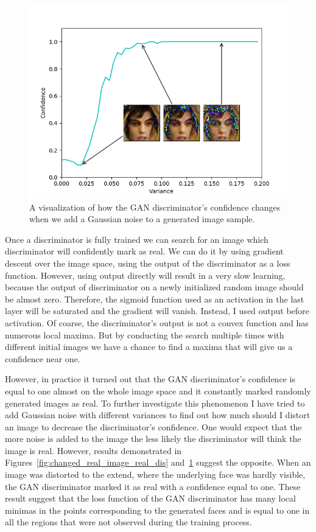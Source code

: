 \begin{figure}[h!]
	\includegraphics[width=\textwidth]{figures/diversity_gan2_fake_dis_gen_images}
	\caption{A visualization of how the GAN discriminator's confidence changes when we add a Gaussian noise to a generated image sample.}
	\label{fig:changed_gen_image_fake_dis}
\end{figure}

Once a discriminator is fully trained we can search for an image which discriminator will confidently mark as real. We can do it by using gradient descent over the image space, using the output of the discriminator as a loss function. However, using output directly will result in a very slow learning, because the output of discriminator on a newly initialized random image should be almost zero. Therefore, the sigmoid function used as an activation in the last layer will be saturated and the gradient will vanish. Instead, I used output before activation. Of coarse, the discriminator's output is not a convex function and has numerous local maxima. But by conducting the search multiple times with different initial images we have a chance to find a maxima that will give us a confidence near one. 

However, in practice it turned out that the GAN discriminator's confidence is equal to one almost on the whole image space and it constantly marked randomly generated images as real. To further investigate this phenomenon I have tried to add Gaussian noise with different variances to find out how much should I distort an image to decrease the discriminator's confidence. One would expect that the more noise is added to the image the less likely the discriminator will think the image is real. However, results demonstrated in Figures~\ref{fig:changed_real_image_real_dis} and~\ref{fig:changed_gen_image_fake_dis} suggest the opposite. When an image was distorted to the extend, where the underlying face was hardly visible, the GAN discriminator marked it as real with a confidence equal to one. These result suggest that the loss function of the GAN discriminator has many local minimas in the points corresponding to the generated faces and is equal to one in all the regions that were not observed during the training process. 




